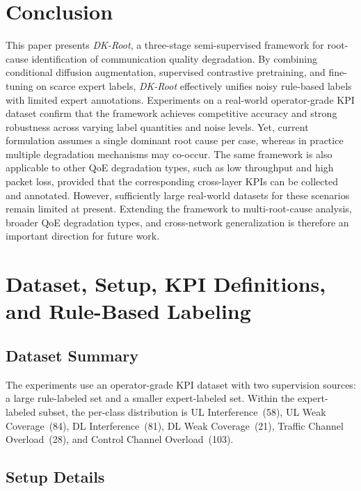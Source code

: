 \documentclass[lettersize,journal]{IEEEtran}
\begin{document}
{\section{Conclusion}
\label{conclusion}

This paper presents \textit{DK-Root}, a three-stage semi-supervised framework for root-cause identification of communication quality degradation. By combining conditional diffusion augmentation, supervised contrastive pretraining, and fine-tuning on scarce expert labels, \textit{DK-Root} effectively unifies noisy rule-based labels with limited expert annotations. Experiments on a real-world operator-grade KPI dataset confirm that the framework achieves competitive accuracy and strong robustness across varying label quantities and noise levels.
{\color{R1color}Yet, current formulation assumes a single dominant root cause per case, whereas in practice multiple degradation mechanisms may co-occur. The same framework is also applicable to other QoE degradation types, such as low throughput and high packet loss, provided that the corresponding cross-layer KPIs can be collected and annotated. However, sufficiently large real-world datasets for these scenarios remain limited at present. Extending the framework to multi-root-cause analysis, broader QoE degradation types, and cross-network generalization is therefore an important direction for future work.}

{
\FloatBarrier
\appendices

\section{Dataset, Setup, KPI Definitions, and Rule-Based Labeling}
\label{appendix}

\subsection{Dataset Summary}

The experiments use an operator-grade KPI dataset with two supervision sources: a large rule-labeled set and a smaller expert-labeled set. Within the expert-labeled subset, the per-class distribution is UL Interference~(58), UL Weak Coverage~(84), DL Interference~(81), DL Weak Coverage~(21), Traffic Channel Overload~(28), and Control Channel Overload~(103). 

\subsection{Setup Details}

}}
\end{document}

